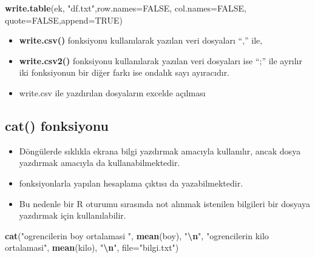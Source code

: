 \documentclass[
  oneside]{book}
\newenvironment{Shaded}{\begin{snugshade}}{\end{snugshade}}
\newcommand{\AttributeTok}[1]{\textcolor[rgb]{0.13,0.29,0.53}{#1}}
\newcommand{\ConstantTok}[1]{\textcolor[rgb]{0.56,0.35,0.01}{#1}}
\newcommand{\FunctionTok}[1]{\textcolor[rgb]{0.13,0.29,0.53}{\textbf{#1}}}
\newcommand{\NormalTok}[1]{#1}
\newcommand{\SpecialCharTok}[1]{\textcolor[rgb]{0.81,0.36,0.00}{\textbf{#1}}}
\newcommand{\StringTok}[1]{\textcolor[rgb]{0.31,0.60,0.02}{#1}}
\providecommand{\tightlist}{%
  \setlength{\itemsep}{0pt}\setlength{\parskip}{0pt}}
\begin{document}
\begin{Shaded}
\begin{Highlighting}[]
\FunctionTok{write.table}\NormalTok{(ek, }\StringTok{"df.txt"}\NormalTok{,}\AttributeTok{row.names=}\ConstantTok{FALSE}\NormalTok{,}
            \AttributeTok{col.names=}\ConstantTok{FALSE}\NormalTok{,}
            \AttributeTok{quote=}\ConstantTok{FALSE}\NormalTok{,}\AttributeTok{append=}\ConstantTok{TRUE}\NormalTok{)}
\end{Highlighting}
\end{Shaded}

\begin{itemize}
\item
  \textbf{write.csv()} fonksiyonu kullanılarak yazılan veri dosyaları ``,'' ile,
\item
  \textbf{write.csv2()} fonksiyonu kullanılarak yazılan veri dosyaları ise ``;'' ile ayrılır iki fonksiyonun bir diğer farkı ise ondalık sayı ayıracıdır.
\item
  write.csv ile yazdırılan dosyaların excelde açılması
\end{itemize}

\hypertarget{cat-fonksiyonu}{%
\subsection{\texorpdfstring{\textbf{cat()} fonksiyonu}{cat() fonksiyonu}}\label{cat-fonksiyonu}}

\begin{itemize}
\tightlist
\item
  Döngülerde sıklıkla ekrana bilgi yazdırmak amacıyla kullanılır, ancak dosya yazdırmak amacıyla da kullanabilmektedir.
\item
  fonksiyonlarla yapılan hesaplama çıktısı da yazabilmektedir.
\item
  Bu nedenle bir R oturumu sırasında not alınmak istenilen bilgileri bir dosyaya yazdırmak için kullanılabilir.
\end{itemize}

\begin{Shaded}
\begin{Highlighting}[]
 \FunctionTok{cat}\NormalTok{(}\StringTok{"ogrencilerin boy ortalamasi "}\NormalTok{, }\FunctionTok{mean}\NormalTok{(boy), }\StringTok{"}\SpecialCharTok{\textbackslash{}n}\StringTok{"}\NormalTok{,}
      \StringTok{"ogrencilerin kilo ortalamasi"}\NormalTok{, }\FunctionTok{mean}\NormalTok{(kilo), }\StringTok{"}\SpecialCharTok{\textbackslash{}n}\StringTok{"}\NormalTok{,}
     \AttributeTok{file=}\StringTok{"bilgi.txt"}\NormalTok{)}
\end{Highlighting}
\end{Shaded}
\end{document}
